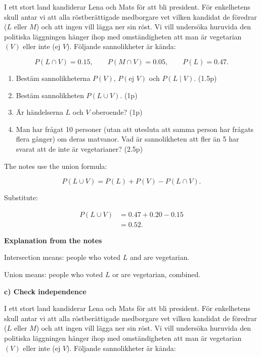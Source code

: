 \documentclass[10pt]{article}
\begin{document}
I ett stort land kandiderar Lena och Mats för att
bli president.
För enkelhetens skull antar vi att alla
röstberättigade medborgare vet vilken kandidat de
föredrar (\(L\) eller \(M\)) och att ingen vill lägga
ner sin röst.
Vi vill undersöka huruvida den politiska läggningen
hänger ihop med omständigheten att man är vegetarian
\((V)\) eller inte (ej \(V\)).
Följande sannolikheter är kända:

\[
P(L\cap V)=0.15,
\qquad
P(M\cap V)=0.05,
\qquad
P(L)=0.47.
\]

\begin{enumerate}[label=\alph*)]
\item Bestäm sannolikheterna
\(P(V)\), \(P(\text{ej }V)\) och \(P(L\mid V)\).
\hfill (1.5p)

\item Bestäm sannolikheten \(P(L\cup V)\).
\hfill (1p)

\item Är händelserna \(L\) och \(V\) oberoende?
\hfill (1p)

\item Man har frågat 10 personer (utan att utesluta
att samma person har frågats flera gånger) om deras
matvanor.
Vad är sannolikheten att fler än 5 har svarat att de
inte är vegetarianer?
\hfill (2.5p)
\end{enumerate}

The notes use the union formula:

\[
P(L\cup V)
=P(L)+P(V)-P(L\cap V).
\]

Substitute:

\begin{align*}
P(L\cup V)
&=0.47+0.20-0.15 \\[2mm]
&=0.52.
\end{align*}

\textbf{Explanation from the notes}

Intersection means:
people who voted \(L\) and are vegetarian.

Union means:
people who voted \(L\) or are vegetarian,
combined.

\textbf{c) Check independence}

I ett stort land kandiderar Lena och Mats för att
bli president.
För enkelhetens skull antar vi att alla
röstberättigade medborgare vet vilken kandidat de
föredrar (\(L\) eller \(M\)) och att ingen vill lägga
ner sin röst.
Vi vill undersöka huruvida den politiska läggningen
hänger ihop med omständigheten att man är vegetarian
\((V)\) eller inte (ej \(V\)).
Följande sannolikheter är kända:
\end{document}
